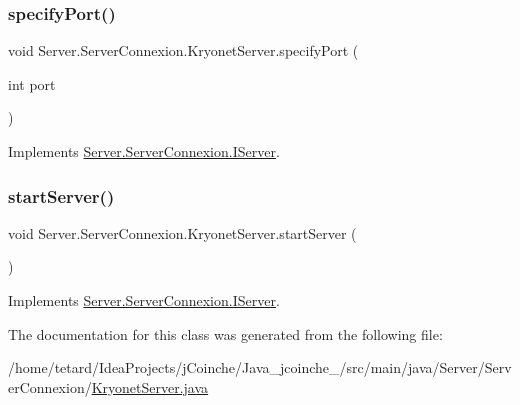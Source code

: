 \subsubsection{\texorpdfstring{specify\+Port()}{specifyPort()}}
{\footnotesize\ttfamily void Server.\+Server\+Connexion.\+Kryonet\+Server.\+specify\+Port (\begin{DoxyParamCaption}\item[{int}]{port }\end{DoxyParamCaption})\hspace{0.3cm}{\ttfamily [inline]}}



Implements \mbox{\hyperlink{interfaceServer_1_1ServerConnexion_1_1IServer_a708adb2b4f2312b4319496d92357bd0e}{Server.\+Server\+Connexion.\+I\+Server}}.

\mbox{\label{classServer_1_1ServerConnexion_1_1KryonetServer_a8bad9bf2baafbe83e2a6153c22b86bae}} 
\subsubsection{\texorpdfstring{start\+Server()}{startServer()}}
{\footnotesize\ttfamily void Server.\+Server\+Connexion.\+Kryonet\+Server.\+start\+Server (\begin{DoxyParamCaption}{ }\end{DoxyParamCaption})\hspace{0.3cm}{\ttfamily [inline]}}



Implements \mbox{\hyperlink{interfaceServer_1_1ServerConnexion_1_1IServer_a13c33c54ae46ee73c99ae8b9a70b9397}{Server.\+Server\+Connexion.\+I\+Server}}.



The documentation for this class was generated from the following file\+:\begin{DoxyCompactItemize}
\item 
/home/tetard/\+Idea\+Projects/j\+Coinche/\+Java\+\_\+jcoinche\+\_/src/main/java/\+Server/\+Server\+Connexion/\mbox{\hyperlink{KryonetServer_8java}{Kryonet\+Server.\+java}}\end{DoxyCompactItemize}
